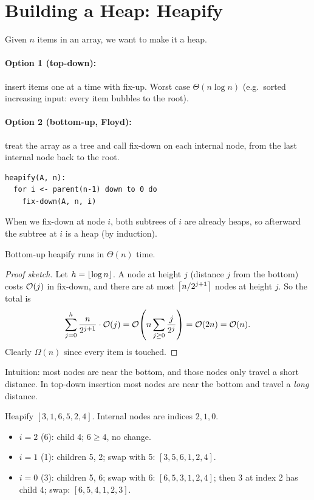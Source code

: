 \section{Building a Heap: Heapify}

Given $n$ items in an array, we want to make it a heap.

\paragraph{Option 1 (top-down):} insert items one at a time with fix-up. Worst
case $\Theta(n \log n)$ (e.g.\ sorted increasing input: every item bubbles to
the root).

\paragraph{Option 2 (bottom-up, Floyd):} treat the array as a tree and call
fix-down on each internal node, from the last internal node back to the root.
\begin{lstlisting}
heapify(A, n):
  for i <- parent(n-1) down to 0 do
    fix-down(A, n, i)
\end{lstlisting}
When we fix-down at node $i$, both subtrees of $i$ are already heaps, so
afterward the subtree at $i$ is a heap (by induction).

\begin{theorem}
Bottom-up heapify runs in $\Theta(n)$ time.
\end{theorem}
\begin{proof}[Proof sketch]
Let $h = \left\lfloor \log n \right\rfloor$. A node at height $j$ (distance $j$ from the bottom)
costs $\mathcal{O}(j)$ in fix-down, and there are at most $\left\lceil n/2^{j+1} \right\rceil$ nodes at
height $j$. So the total is
\[
\sum_{j=0}^{h} \frac{n}{2^{j+1}} \cdot \mathcal{O}(j)
= \mathcal{O}\!\left(n \sum_{j \ge 0} \frac{j}{2^{j}}\right) = \mathcal{O}(2n) = \mathcal{O}(n).
\]
Clearly $\Omega(n)$ since every item is touched.
\end{proof}

Intuition: most nodes are near the bottom, and those nodes only travel a short
distance. In top-down insertion most nodes are near the bottom and travel a
\emph{long} distance.

\begin{example}
Heapify $[3, 1, 6, 5, 2, 4]$. Internal nodes are indices $2, 1, 0$.
\begin{itemize}
  \item $i = 2$ (6): child 4; $6 \ge 4$, no change.
  \item $i = 1$ (1): children 5, 2; swap with 5: $[3,5,6,1,2,4]$.
  \item $i = 0$ (3): children 5, 6; swap with 6: $[6,5,3,1,2,4]$; then 3 at index
        2 has child 4; swap: $[6,5,4,1,2,3]$.
\end{itemize}
\end{example}

